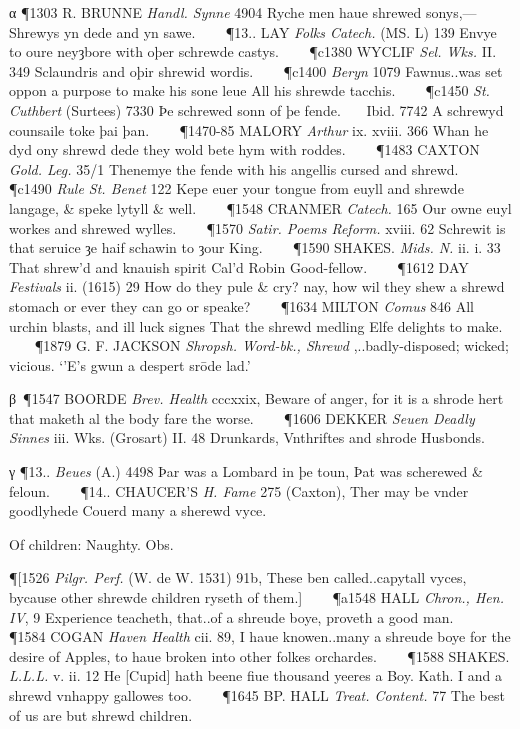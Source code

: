 \begin{description}[wide, labelwidth=!, labelindent=0pt]
\begin{myenumerate}
α \P 1303 R. BRUNNE  \textit{Handl. Synne} 4904 Ryche men haue shrewed sonys,—Shrewys yn dede and yn sawe.    
\P 13.. LAY  \textit{Folks Catech.} (MS. L) 139 Envye to oure neyȝbore with oþer schrewde castys.    
\P c1380 WYCLIF  \textit{Sel. Wks.} II. 349 Sclaundris and oþir shrewid wordis.    
\P c1400  \textit{Beryn} 1079 Fawnus..was  set oppon a purpose to make his sone leue All his shrewde tacchis.    
\P c1450  \textit{St. Cuthbert} (Surtees) 7330 Þe schrewed sonn of þe fende.    Ibid. 7742 A schrewyd counsaile toke þai þan.    
\P 1470-85 MALORY  \textit{Arthur} ix. xviii. 366 Whan he dyd ony shrewd dede they wold bete hym with roddes.    
\P 1483 CAXTON  \textit{Gold. Leg.} 35/1 Thenemye the fende with his angellis cursed and shrewd.    
\P c1490  \textit{ Rule St. Benet} 122 Kepe euer your tongue from euyll and shrewde langage, \& speke lytyll \& well.    
\P 1548 CRANMER  \textit{Catech.} 165 Our owne euyl workes and shrewed wylles.    
\P 1570  \textit{Satir. Poems Reform.} xviii. 62 Schrewit is that seruice ȝe haif schawin to ȝour King.    
\P 1590 SHAKES.  \textit{Mids. N.} ii. i. 33 That shrew'd and knauish spirit Cal'd Robin Good-fellow.    
\P 1612 DAY  \textit{Festivals} ii. (1615) 29 How do they pule \& cry? nay, how wil they shew a shrewd stomach or ever they can go or speake?    
\P 1634 MILTON  \textit{Comus} 846 All urchin blasts, and ill luck signes That the shrewd medling Elfe delights to make.    
\P 1879 G. F. JACKSON  \textit{Shropsh. Word-bk., Shrewd} ,..badly-disposed; wicked; vicious. ‘'E's gwun a despert srōde lad.’

β \P 1547 BOORDE  \textit{Brev. Health} cccxxix, Beware of anger, for it is a shrode hert that maketh al the body fare the worse.    
\P 1606 DEKKER  \textit{Seuen Deadly Sinnes} iii. Wks. (Grosart) II. 48 Drunkards, Vnthriftes and shrode Husbonds.

γ \P 13.. \textit{Beues}  (A.) 4498 Þar was a Lombard in þe toun, Þat was scherewed \& feloun.    
\P 14.. CHAUCER'S  \textit{H. Fame} 275 (Caxton), Ther may be vnder goodlyhede Couerd many a sherewd vyce.

 Of children: Naughty. Obs.

\P [1526  \textit{Pilgr. Perf.} (W. de W. 1531) 91b, These ben called..capytall vyces, bycause other shrewde children ryseth of them.]    
\P a1548 HALL  \textit{Chron., Hen. IV}, 9 Experience teacheth, that..of a shreude boye, proveth a good man.    
\P 1584 COGAN  \textit{Haven Health} cii. 89, I haue knowen..many a shreude boye for the desire of Apples, to haue broken into other folkes orchardes.    
\P 1588 SHAKES.  \textit{L.L.L.} v. ii. 12 He [Cupid] hath beene fiue thousand yeeres a Boy. Kath. I and a shrewd vnhappy gallowes too.    
\P 1645 BP. HALL  \textit{Treat. Content.} 77 The best of us are but shrewd children.


\end{myenumerate}
\end{description}
